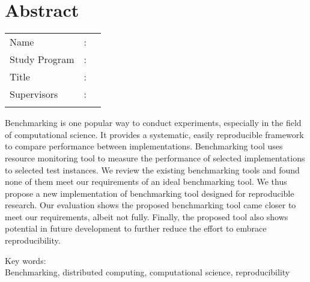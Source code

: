 %
%
%

\chapter*{Abstract}

\vspace*{0.2cm}
{
	\setlength{\parindent}{0pt}

	\begin{tabular}{@{}l l p{10cm}}
		Name&: & \penulis \\
		Study Program&: & \program \\
		Title&: & \judulInggris \\
		Supervisors&: & \pembimbing \\
				   &  & \pembimbingDua \\
	\end{tabular}

	\bigskip
	\bigskip

	Benchmarking is one popular way to conduct experiments, especially in the field of computational science.
	It provides a systematic, easily reproducible framework to compare performance between implementations.
	Benchmarking tool uses resource monitoring tool to measure the performance of selected implementations to selected test instances.
	We review the existing benchmarking tools and found none of them meet our requirements of an ideal benchmarking tool.
	We thus propose a new implementation of benchmarking tool designed for reproducible research.
	Our evaluation shows the proposed benchmarking tool came closer to meet our requirements, albeit not fully.
	Finally, the proposed tool also shows potential in future development to further reduce the effort to embrace reproducibility.

	\bigskip

	Key words:\\
	Benchmarking, distributed computing, computational science, reproducibility
}

\newpage